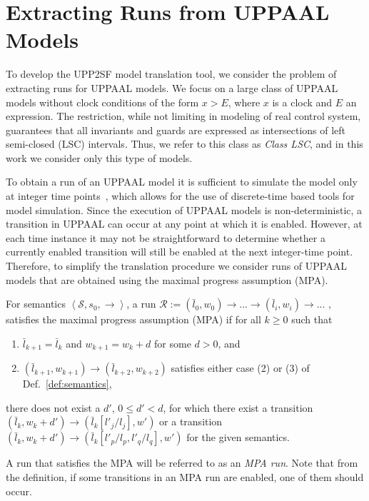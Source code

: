 \section{Extracting Runs from UPPAAL Models}
\label{sec:runs}


To develop the UPP2SF model translation tool, we consider the problem of extracting runs for UPPAAL models. We focus on a large class of UPPAAL models without clock conditions of the form $x>E$, where $x$ is a clock and $E$ an expression. The restriction, while not limiting in modeling of real control system, guarantees that all invariants and guards are expressed as intersections of left semi-closed (LSC) intervals. Thus, we refer to this class as \textit{Class LSC}, and in this work we consider only this type of models. 

To obtain a run of an UPPAAL model it is sufficient to simulate the model only at integer time points~\cite{PMupp2sf_rtas12}, which allows for the use of discrete-time based tools for model simulation. Since the execution of UPPAAL models is non-deterministic, a transition in UPPAAL can occur at any point at which it is enabled. However, at each time instance it may not be straightforward to determine whether a currently enabled transition will still be enabled at the next integer-time point. 
Therefore, to simplify the translation procedure we consider runs of UPPAAL models that are obtained using the maximal progress assumption (MPA). 


\begin{definition}
For semantics $\left<\mathcal{S},s_0,\rightarrow\right>$, a run 
$\mathcal{R}:=(\bar{l}_0,w_0)\rightarrow...\rightarrow(\bar{l}_i,w_i)\rightarrow...$ , 
satisfies the maximal progress assumption (MPA) if for all $k\geq 0$ such that
\begin{enumerate}
\item $\bar{l}_{k+1}=\bar{l}_{k}$ and $w_{k+1}=w_k+d$ for some $d>0$, and
\item $(\bar{l}_{k+1},w_{k+1}) \rightarrow (\bar{l}_{k+2},w_{k+2})$ satisfies either case (2) or (3) of Def.~\ref{def:semantics},
\end{enumerate}
there does not exist a $d'$, $0\leq d'<d$, for which there exist a transition
$(\bar{l}_k,w_k+d') \rightarrow (\bar{l}_k[l'_j/l_j],w')$ or a transition $(\bar{l}_{k},w_{k}+d') \rightarrow (\bar{l}_k[l'_p/l_p,l'_q/l_q],w')$ for the given semantics.
\end{definition}

A run that satisfies the MPA will be referred to as an \textit{MPA run}. Note that from the definition, if some transitions in an MPA run are enabled, one of them should occur. 

